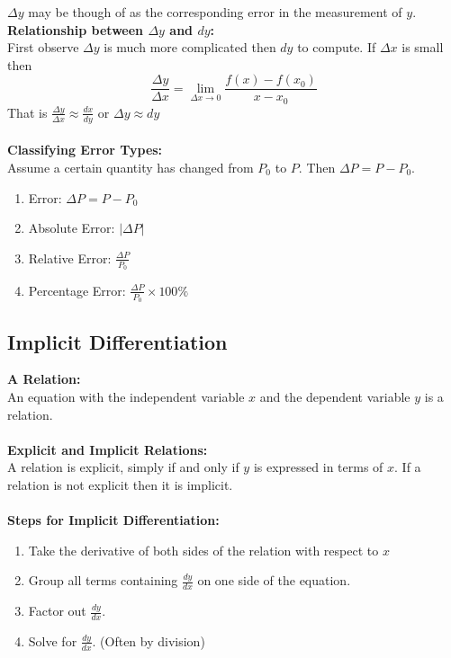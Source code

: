 \documentclass[14pt]{article}
\begin{document}
    $\Delta y$ may be though of as the corresponding error in the
    measurement of $y$.\\
    \textbf{Relationship between $\Delta y$ and $dy$:}\\
    First observe $\Delta y$ is much more complicated then $dy$ to
    compute. If $\Delta x$ is small then $$\frac{\Delta y}{\Delta
    x}=\lim \limits_{\Delta x\rightarrow 0}\frac{f(x)-f(x_0)}{x-x_0}$$
    That is $\frac{\Delta y}{\Delta x}\approx\frac{dx}{dy}$ or $\Delta
    y\approx dy$\\\\
    \textbf{Classifying Error Types:}\\
    Assume a certain quantity has changed from $P_0$ to $P$. Then
    $\Delta P= P-P_0$.
    \begin{enumerate}
        \item Error: $\Delta P=P-P_0$
        \item Absolute Error: $|\Delta P|$
        \item Relative Error: $\frac{\Delta P}{P_0}$
        \item Percentage Error: $\frac{\Delta P}{P_0}\times 100\% $ 
    \end{enumerate}
    \subsection{Implicit Differentiation}
    \textbf{A Relation:}\\
    An equation with the independent variable $x$ and the dependent
    variable $y$ is a relation.\\\\
    \textbf{Explicit and Implicit Relations:}\\
    A relation is explicit, simply if and only if $y$ is expressed in
    terms of $x$. If a relation is not explicit then it is implicit.\\\\
    \textbf{Steps for Implicit Differentiation:}\\
    \begin{enumerate}
        \item Take the derivative of both sides of the relation with
        respect to $x$
        \item Group all terms containing $\frac{dy}{dx}$ on one side of
        the equation.
        \item Factor out $\frac{dy}{dx}$.
        \item Solve for $\frac{dy}{dx}$. (Often by division)
    \end{enumerate}
\end{document}

